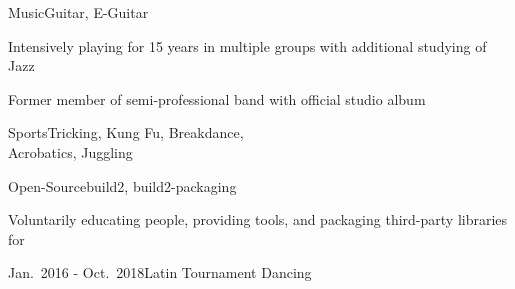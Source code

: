 \documentclass[a4paper,10pt]{cv}
\begin{document}
  \bigskip
    \vspace{-1em}
    \begin{multicols}{2}
      \begin{cvTimeItem}{Music}{Guitar, E-Guitar}
        \begin{cvItemize}
          \item Intensively playing for 15 years in multiple groups with additional studying of Jazz
          \item Former member of semi-professional band  with official studio album
        \end{cvItemize}
      \end{cvTimeItem}
      \begin{cvTimeItem}{Sports}{Tricking, Kung Fu, Breakdance, \\ Acrobatics, Juggling}
      \end{cvTimeItem}
      \begin{cvTimeItem}{Open-Source}{build2, build2-packaging}
        \begin{cvItemize}
          \item Voluntarily educating people, providing tools, and packaging third-party libraries for 
        \end{cvItemize}
      \end{cvTimeItem}
      \begin{cvTimeItem}{Jan.~2016 - Oct.~2018}{Latin Tournament Dancing}
        \begin{cvItemize}

\end{cvItemize}
\end{cvTimeItem}
\end{multicols}
\end{document}
